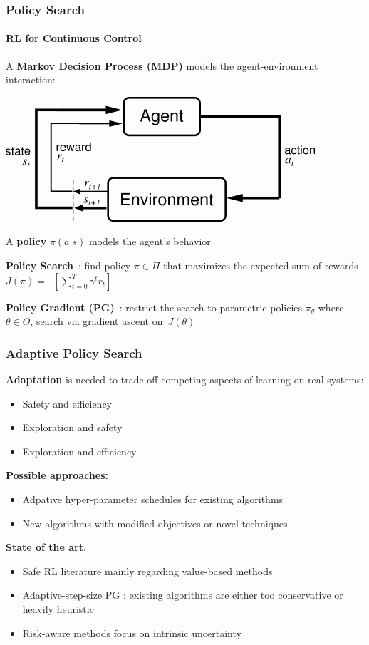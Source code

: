 \documentclass{beamer}
\begin{document}
\begin{frame}
\frametitle{Policy Search}
\framesubtitle{RL for Continuous Control}
A \textbf{Markov Decision Process (MDP)} models the agent-environment interaction:

\begin{center}
	\includegraphics[width=.5\textwidth]{pics/rl.png}
\end{center}

A \textbf{policy} $\pi(a\vert s)$ models the agent's behavior

\vfill

\textbf{Policy Search}~\cite{deisenroth2013survey}: find policy $\pi \in \Pi$ that maximizes the expected sum of rewards ${J(\pi) = \mathop{E_{\pi}}\left[\sum_{t=0}^{T}\gamma^tr_t\right]}$

\textbf{Policy Gradient (PG)}~\cite{sutton2000policy}: restrict the search to parametric policies $\pi_{\theta}$ where $\theta \in \Theta$, search via gradient ascent on~$J(\theta)$

\end{frame}


\begin{frame}
\frametitle{Adaptive Policy Search}

\textbf{Adaptation} is needed to trade-off competing aspects of learning on real systems:
\begin{itemize}
	\item Safety and efficiency
	\item Exploration and safety
	\item Exploration and efficiency
\end{itemize}

\vfill

\textbf{Possible approaches:}
\begin{itemize}
	\item Adpative hyper-parameter schedules for existing algorithms
	\item New algorithms with modified objectives or novel techniques
\end{itemize}

\vfill

\textbf{State of the art}:
\begin{itemize}
	\item Safe RL literature \cite{garcia2015comprehensive} mainly regarding value-based methods 
	\item Adaptive-step-size PG \cite{pirotta2013adaptive,schulman2015trust}: existing algorithms are either too conservative  or heavily heuristic
	\item Risk-aware methods \cite{moldovan2014safety} focus on intrinsic uncertainty
\end{itemize}

\end{frame}
\end{document}
